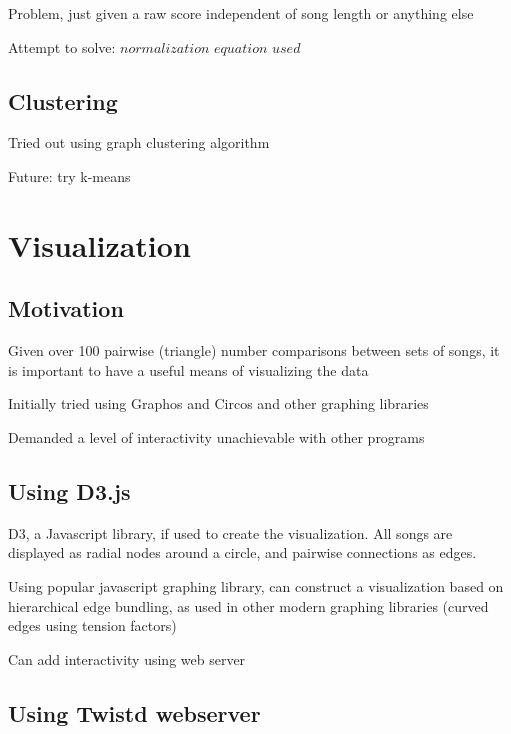 \item Problem, just given a raw score independent of song length or anything else

\item Attempt to solve: $normalization$ $equation$ $used$

\subsection{Clustering}

\item Tried out using graph clustering algorithm

\item Future: try k-means

\section{Visualization}

\subsection{Motivation}

\item Given over 100 pairwise (triangle) number comparisons between sets of songs, it is important to have a useful means of visualizing the data

\item Initially tried using Graphos and Circos and other graphing libraries

\item Demanded a level of interactivity unachievable with other programs

\subsection{Using D3.js}

D3, a Javascript library, if used to create the visualization. All songs are displayed as radial nodes around a circle, and pairwise connections as edges.

\item Using popular javascript graphing library, can construct a visualization based on hierarchical edge bundling, as used in other modern graphing libraries (curved edges using tension factors)

\item Can add interactivity using web server

\subsection{Using Twistd webserver}


